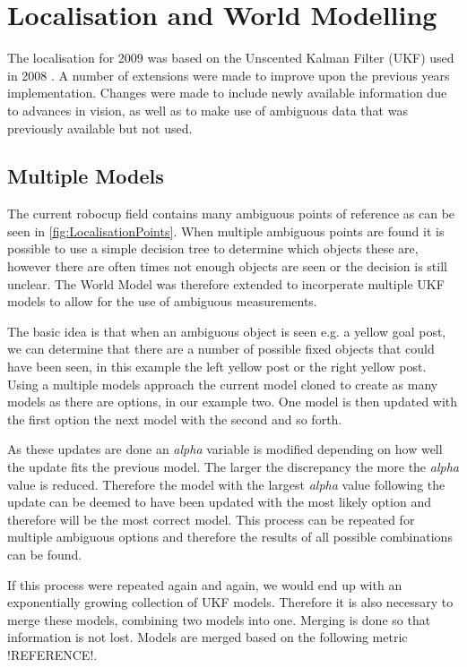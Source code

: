 \section{Localisation and World Modelling}
\label{sec:Localisation}
The localisation for 2009 was based on the Unscented Kalman Filter (UKF) used in 2008 \cite{NUManoids2008}. A number of extensions were made to improve upon the previous years implementation. Changes were made to include newly available information due to advances in vision, as well as to make use of ambiguous data that was previously available but not used.

\subsection{Multiple Models}
The current robocup field contains many ambiguous points of reference as can be seen in \autoref{fig:LocalisationPoints}. When multiple ambiguous points are found it is possible to use a simple decision tree to determine which objects these are, however there are often times not enough objects are seen or the decision is still unclear. The World Model was therefore extended to incorperate multiple UKF models to allow for the use of ambiguous measurements.

The basic idea is that when an ambiguous object is seen e.g. a yellow goal post, we can determine that there are a number of possible fixed objects that could have been seen, in this example the left yellow post or the right yellow post. Using a multiple models approach the current model cloned to create as many models as there are options, in our example two. One model is then updated with the first option the next model with the second and so forth.

As these updates are done an \emph{alpha} variable is modified depending on how well the update fits the previous model. The larger the discrepancy the more the \emph{alpha} value is reduced. Therefore the model with the largest \emph{alpha} value following the update can be deemed to have been updated with the most likely option and therefore will be the most correct model. This process can be repeated for multiple ambiguous options and therefore the results of all possible combinations can be found.

If this process were repeated again and again, we would end up with an exponentially growing collection of UKF models. Therefore it is also necessary to merge these models, combining two models into one. Merging is done so that information is not lost. Models are merged based on the following metric !REFERENCE!.

